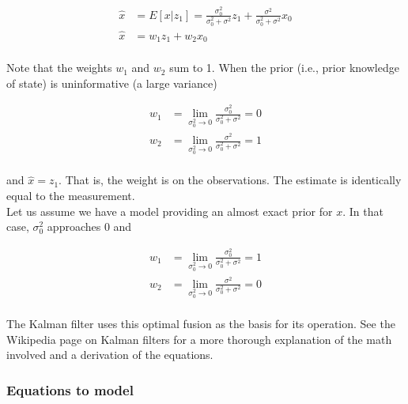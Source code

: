 \documentclass[10pt,conference,compsoc]{IEEEtran}
\begin{document}
\begin{align}
  \hat{x} &= E[x|z_1] = \frac{\sigma_0^2}{\sigma_0^2 + \sigma^2}z_1 +
    \frac{\sigma^2}{\sigma_0^2 + \sigma^2}x_0 \\
  \hat{x} &= w_1 z_1 + w_2 x_0 \nonumber
\end{align}
\\
Note that the weights $w_1$ and $w_2$ sum to 1. When the prior (i.e., prior
knowledge of state) is uninformative (a large variance)

\begin{align}
  w_1 &= \lim_{\sigma_0^2 \to 0} \frac{\sigma_0^2}{\sigma_0^2 + \sigma^2} = 0 \\
  w_2 &= \lim_{\sigma_0^2 \to 0} \frac{\sigma^2}{\sigma_0^2 + \sigma^2} = 1
\end{align}
\\
and $\hat{x} = z_1$. That is, the weight is on the observations. The estimate is
identically equal to the measurement. \\

Let us assume we have a model providing an almost exact prior for $x$. In that
case, $\sigma_0^2$ approaches 0 and

\begin{align}
  w_1 &= \lim_{\sigma_0^2 \to 0} \frac{\sigma_0^2}{\sigma_0^2 + \sigma^2} = 1 \\
  w_2 &= \lim_{\sigma_0^2 \to 0} \frac{\sigma^2}{\sigma_0^2 + \sigma^2} = 0
\end{align}
\\
The Kalman filter uses this optimal fusion as the basis for its operation. See
the Wikipedia page on Kalman filters \cite{bib:kalman_filter} for a more
thorough explanation of the math involved and a derivation of the equations.

\subsubsection{Equations to model}
\end{document}
